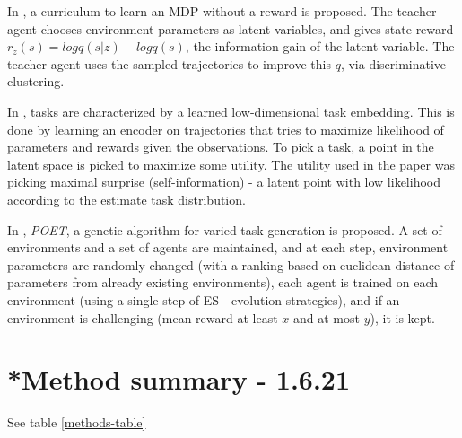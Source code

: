 \documentclass[letterpaper]{article}
\theoremstyle{definition}
\begin{document}
In \cite{Jabri2019}, a curriculum to learn an MDP without a reward is proposed. The teacher agent chooses environment parameters as latent variables, and gives state reward $r_z(s) = log q(s|z) - log q(s)$, the information gain of the latent variable. The teacher agent uses the sampled trajectories to improve this $q$, via discriminative clustering.

In \cite{Kaddour2020}, tasks are characterized by a learned low-dimensional task embedding. This is done by learning an encoder on trajectories that tries to maximize likelihood of parameters and rewards given the observations. To pick a task, a point in the latent space is picked to maximize some utility.
The utility used in the paper was picking maximal surprise (self-information) - a latent point with low likelihood according to the estimate task distribution.

In \cite{Wang2019}, \textit{POET}, a genetic algorithm for varied task generation is proposed. A set of environments and a set of agents are maintained, and at each step, environment parameters are randomly changed (with a ranking based on euclidean distance of parameters from already existing environments), each agent is trained on each environment (using a single step of ES - evolution strategies), and if an environment is challenging (mean reward at least $x$ and at most $y$), it is kept.

\section{*Method summary - 1.6.21} \label{sec:summary}

See table \ref{methods-table}
\end{document}
